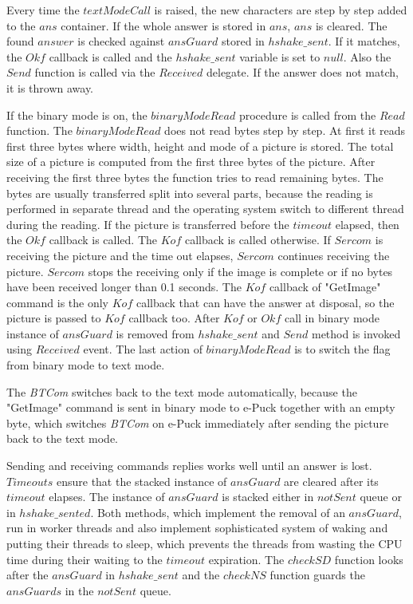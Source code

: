   Every time the $textModeCall$ is raised, the new characters are step by step
  added to the $ans$ container. If the whole answer is stored in $ans$, $ans$ is cleared.
  The found $answer$ is checked against $ansGuard$ stored in $hshake\_sent$.
  If it matches, the $Okf$ callback is called and the $hshake\_sent$ variable is set to $null$. 
  Also the $Send$ function is called via the $Received$ delegate. If the answer does not match, it is thrown away. 
  
  If the binary mode is on, the $binaryModeRead$ procedure is called from
  the $Read$ function. The $binaryModeRead$ does not read bytes step by step.
  At first it reads first three bytes where width, height and mode of a picture is stored.
  The total size of a picture is computed from the first three bytes of the picture.
  After receiving the first three bytes the function tries to read remaining bytes.
  The bytes are usually transferred split into several parts,
  because the reading is performed in separate thread and 
  the operating system switch to different thread during the reading.
  If the picture is transferred before the $timeout$ elapsed, then the $Okf$ callback is called.
  The $Kof$ callback is called otherwise. 
  If $Sercom$ is receiving the picture and the time out elapses,
  $Sercom$ continues receiving the picture. $Sercom$ stops the receiving only if
  the image is complete or if no bytes have been received longer than 0.1 seconds.
  The $Kof$ callback of "GetImage" command is the only $Kof$ callback 
  that can have the answer at disposal, so the picture is passed to $Kof$ callback too.	
  After $Kof$ or $Okf$ call in binary mode instance of $ansGuard$ is removed from $hshake\_sent$ 
  and $Send$ method is invoked using $Received$ event.
  The last action of $binaryModeRead$ is to switch the flag from binary mode to text mode.
  
  The {\it BTCom} switches back to the text mode automatically, because
  the "GetImage" command is sent in binary mode to e-Puck together with an empty byte, which
  switches {\it BTCom} on e-Puck  immediately after sending the picture back to the text mode.

  Sending and receiving commands replies works well 
  until an answer is lost. $Timeouts$ ensure that the stacked instance of $ansGuard$ are cleared after its $timeout$  elapses.
  The instance of $ansGuard$ is stacked either in $notSent$ queue	or in $hshake\_sented$.
  Both methods, which implement the removal of an $ansGuard$, run in worker threads and also implement
  sophisticated system of waking and putting their threads to sleep, which prevents the threads from wasting
  the CPU time during their waiting to the $timeout$ expiration. 
  The $checkSD$ function looks after the $ansGuard$ in $hshake\_sent$ and the $checkNS$ function guards
  the $ansGuards$ in the $notSent$ queue.

